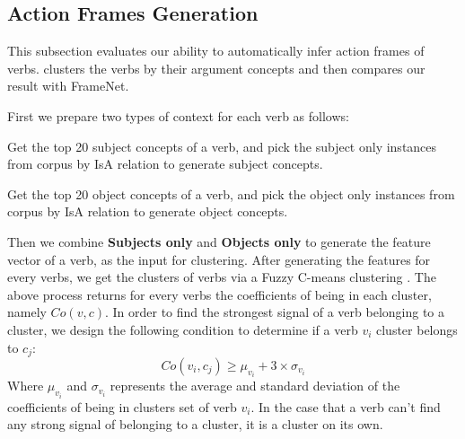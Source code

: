 \subsection{Action Frames Generation}
This subsection evaluates our ability to automatically infer action 
frames of verbs. 
clusters the verbs by their argument concepts and then 
compares our result with FrameNet.

First we prepare two types of context for each verb as follows:
\begin{description}\setlength{\itemsep}{-\itemsep}
\item [Subjects only] Get the top 20 subject concepts of a verb, and pick the subject only instances from corpus by IsA relation to generate subject concepts.
\item [Objects only] Get the top 20 object concepts of a verb, and pick the object only instances from corpus by IsA relation to generate object concepts.
\end{description}
Then we combine \textbf{Subjects only} and \textbf{Objects only} to generate the feature vector of a verb, as the input for clustering.
After generating the features for every verbs, we get the clusters of verbs via a Fuzzy C-means
clustering \cite{dunn73:fuzzycmeans}.
The above process returns for every verbs the coefficients
of being in each cluster, namely $Co(v,c)$. In order to find the 
strongest signal of a verb belonging to a cluster, we design 
the following condition to determine if a verb $v_i$ cluster 
belongs to $c_j$:
$$
Co(v_i,c_j) \geq \mu_{v_i} + 3 \times \sigma_{v_i}
$$
Where $\mu_{v_i}$ and $\sigma_{v_i}$ represents the average and 
standard deviation of the coefficients of being in clusters set 
of verb $v_i$. In the case that a verb can't find any strong signal of 
belonging to a cluster, it is a cluster on its own.

